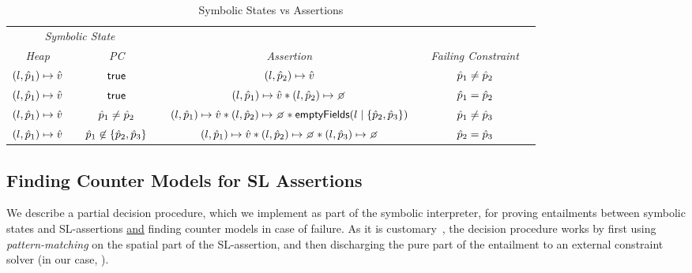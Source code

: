 \begin{table}
\centering
\renewcommand{\arraystretch}{1.2} 
{\scriptsize \begin{tabular}{@{}cccccccc@{}}\toprule
\multicolumn{3}{c}{{\it Symbolic State}} & &  & & & \\
\cmidrule{1-3}%
\emph{Heap}  &  & \emph{PC}  &   &  \emph{Assertion}  & & \emph{Failing Constraint}       \\
\cmidrule{1-1} \cmidrule{3-3} \cmidrule{5-5}  \cmidrule{7-7}
%
$(l, \hat{p}_1) \mapsto \hat{v}$ & & ${\sf true}$ & & 
	$(l, \hat{p}_2) \mapsto \hat{v}$ & &  $\hat{p}_1 \neq \hat{p}_2$ \\    
%
$(l, \hat{p}_1) \mapsto \hat{v}$ & & ${\sf true}$ & & 
	$(\loc, \sexprp_1) \mapsto \sexprv \sep (\loc, \sexprp_2) \mapsto \none$ & &  $\hat{p}_1 = \hat{p}_2$ \\    
%
$(l, \hat{p}_1) \mapsto \hat{v}$ & & $\hat{p}_1 \neq \hat{p}_2$ & & 
	$(\loc, \sexprp_1) \mapsto \sexprv \sep (\loc, \sexprp_2) \mapsto \none \sep \emptyfields{\loc}{\{\sexprp_2, \sexprp_3\}}$ & &  $\hat{p}_1 \neq \hat{p}_3$ \\    
%
$(l, \hat{p}_1) \mapsto \hat{v}$ & & $\hat{p}_1 \not\in \{\hat{p}_2, \hat{p}_3\}$ & & 
	$(\loc, \sexprp_1) \mapsto \sexprv \sep (\loc, \sexprp_2) \mapsto \none \sep (\loc, \sexprp_3) \mapsto \none$ & &  $\hat{p}_2 = \hat{p}_3$ \\    

\bottomrule
\end{tabular}}
\vspace{2pt}
\caption{Symbolic States vs Assertions\label{example:symb:states:vs:assertions}}
\vspace*{-0.7cm}
\end{table}

\subsection{Finding Counter Models for SL Assertions}
\label{subsec:countermodels}

We describe a partial decision procedure, which we  
implement as part of the \jsil symbolic interpreter, for proving entailments 
between symbolic states and SL-assertions \underline{and} finding counter 
models in case of failure.  
As it is customary~\cite{javert,jacobs2011verifast,sepwithsmt}, the decision procedure works by first using \emph{pattern-matching} 
on the spatial part of the SL-assertion, and then discharging the pure part of the 
entailment to an external constraint solver (in our case, \rosette). 

